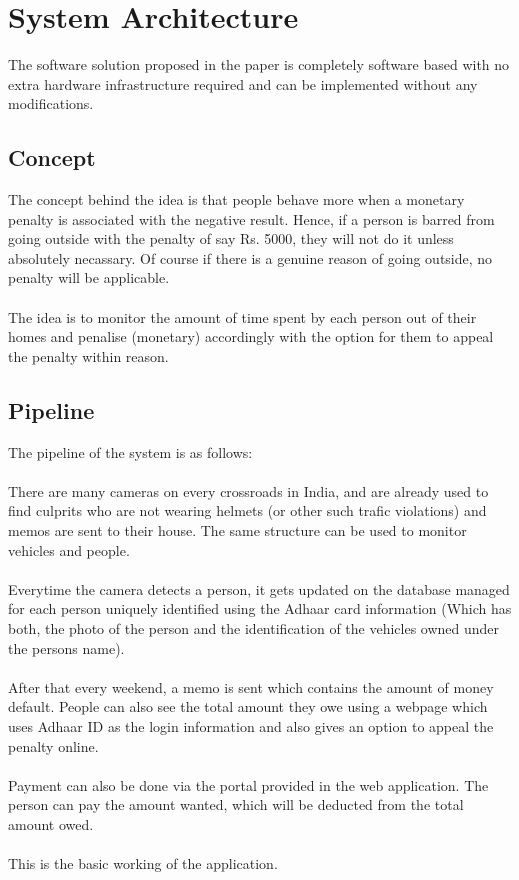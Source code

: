 \documentclass[10pt,twocolumn,letterpaper]{article}
\begin{document}
\section*{System Architecture}
The software solution proposed in the paper is completely software based with 
no extra hardware infrastructure required and can be implemented without 
any modifications.

\subsection*{Concept}
The concept behind the idea is that people behave more when a monetary penalty is 
associated with the negative result. Hence, if a person is barred from going outside 
with the penalty of say Rs. 5000, they will not do it unless absolutely necassary.
Of course if there is a genuine reason of going outside, no penalty will be applicable.
\\\\
The idea is to monitor the amount of time spent by each person out of their 
homes and penalise (monetary) accordingly with the option for them to appeal the 
penalty within reason.

\subsection*{Pipeline}
The pipeline of the system is as follows:\\\\ There are many cameras on every crossroads 
in India, and are already used to find culprits who are not wearing helmets (or 
other such trafic violations) and memos are sent to their house. The same structure 
can be used to monitor vehicles and people.\\\\ Everytime the camera detects a person, 
it gets updated on the database managed for each person uniquely identified 
using the Adhaar card  information (Which has both, the photo of the person and the 
identification of the vehicles owned under the persons name).\\\\After that every 
weekend, a memo is sent which contains the amount of money default. People can 
also see the total amount they owe using a webpage which uses Adhaar ID as the 
login information and also gives an option to appeal the penalty online. \\\\
Payment can also be done via the portal provided in the web application. The 
person can pay the amount wanted, which will be deducted from the total amount 
owed.\\\\
This is the basic working of the application.
\end{document}
